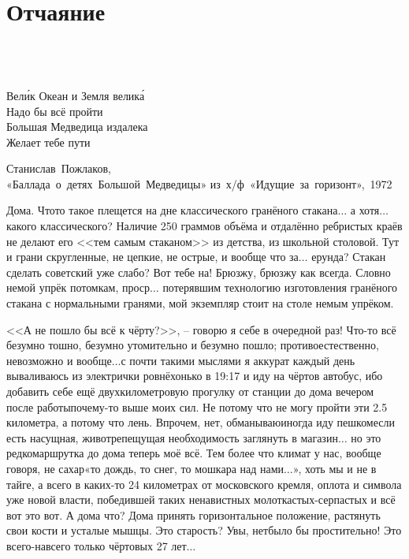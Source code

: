 \chapter{Отчаяние} 

\epigraph{%
	~\\
	~\\	
	~\\	
	Вел\'{и}к Океан и Земля велик\'{а} \\
	Надо бы всё пройти \\
	Большая Медведица издалека \\
	Желает тебе пути}
	{
	\begin{flushright}
		\small{Станислав~Пожлаков,\\«Баллада~о~детях~Большой~Медведицы» из~х/ф~«Идущие~за~горизонт»,~1972}
	\end{flushright}
	}

Дома. Что\sdash то такое плещется на дне классического гранёного стакана$\ldots$ а хотя$\ldots$ какого классического? Наличие 250 граммов объёма и отдалённо ребристых краёв не делают его <<тем самым стаканом>> из детства, из школьной столовой. Тут и грани скругленные, не цепкие, не острые, и вообще что за$\ldots$ ерунда? Стакан сделать советский уже слабо? Вот тебе на! Брюзжу, брюзжу как всегда. Словно немой упрёк потомкам, проср$\ldots$ потерявшим технологию изготовления гранёного стакана с нормальными гранями, мой экземпляр стоит на столе немым упрёком.

<<А не пошло бы всё к чёрту?>>, – говорю я себе в очередной раз! Что-то всё безумно тошно, безумно утомительно и безумно пошло; противоестественно, невозможно и вообще$\ldots$\mdash с почти такими мыслями я аккурат каждый день вываливаюсь из электрички ровнёхонько в 19:17 и иду на чёртов автобус, ибо добавить себе ещё двухкилометровую прогулку от станции до дома вечером после работы\mdash почему-то выше моих сил. Не потому что не могу пройти эти 2.5 километра, а потому что лень. Впрочем, нет, обманываю\mdash иногда иду пешком\mdash если есть насущная, животрепещущая необходимость заглянуть в магазин$\ldots$ но это редко\mdash маршрутка до дома теперь моё всё. Тем более что климат у нас, вообще говоря, не сахар\mdash «то дождь, то снег, то мошкара над нами$\ldots$», хоть мы и не в тайге, а всего в каких-то 24 километрах от московского кремля, оплота и символа уже новой власти, победившей таких ненавистных молоткастых-серпастых и всё вот это вот. А дома что? Дома принять горизонтальное положение, растянуть свои кости и усталые мышцы. Это старость? Увы, нет\mdash было бы простительно! Это всего-навсего только чёртовых 27 лет$\ldots$

